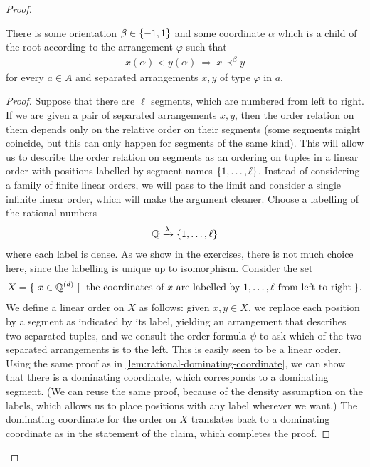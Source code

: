 \begin{proof}
    \begin{claim}\label{claim:domination-lemma-discconnected}
        There is some orientation $\beta \in \{-1,1\}$ and some  coordinate $\alpha$  which is a child of the root according to the arrangement $\varphi$ such that
\begin{align*}
x(\alpha)  < y(\alpha) \ \Rightarrow \ x \prec^\beta y
\end{align*}
for every $a \in A$ and separated arrangements $x,y$ of type $\varphi$ in $a$.
\end{claim}
\begin{proof}
    Suppose that there are $\ell$ segments, which are numbered from left to right. 
If we are given a pair of separated arrangements $x,y$, then the order relation on them depends only on the relative order on their segments (some segments might coincide, but this can only happen for segments of the same kind). This will allow us to describe the order relation on segments as an ordering on tuples in a linear order with positions labelled by segment names $\{1,\ldots,\ell\}$. Instead of considering a family of finite linear orders, we will pass to the limit and consider a single infinite linear order, which will make the argument cleaner.
Choose a labelling of the rational numbers
    \begin{align*}
    {\mathbb Q} \xrightarrow \lambda \{1,\ldots,\ell\}
    \end{align*}
    where each label is dense. As we show in the exercises, there is not much choice here, since the labelling is unique up to isomorphism. Consider the set
    \begin{align*}
    X = \setbuild{ x \in \rattuples d}{the coordinates of $x$ are labelled by $1,\ldots,\ell$ from left to right}.
    \end{align*}
    We define a linear order on $X$ as follows:  given  $x,y \in X$, we replace each position by a segment as indicated by its label,  yielding an arrangement that describes two separated tuples, and we consult the order formula $\psi$ to ask which of the two separated arrangements is to the left. This is easily seen to be  a linear order. Using the same proof as in \cref{lem:rational-dominating-coordinate}, we can show that there is a dominating coordinate, which corresponds to a dominating segment. (We can reuse the same proof, because of the density assumption on the labels, which allows us to place positions with any label wherever we want.)     The dominating coordinate for the order on $X$ translates back to a dominating coordinate as in the statement of the claim, which completes the proof.
\end{proof}


\end{proof}
